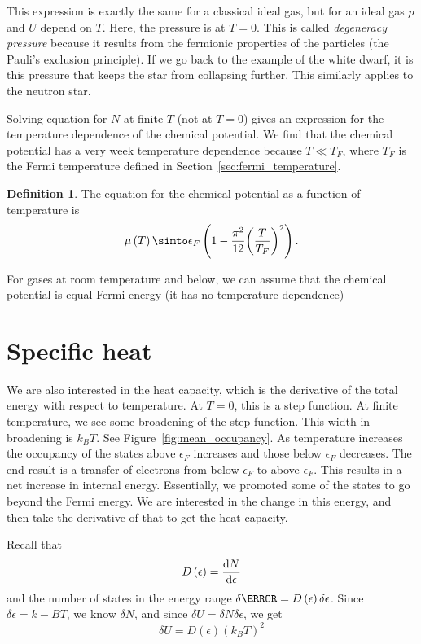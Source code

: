 \documentclass[12pt,chapterprefix=false,dvipsnames]{scrbook}
\theoremstyle{dotless}
\theoremstyle{definition}
\newtheorem{protodefinition}{Definition}[section]
\newenvironment{definition}
{\colorlet{shadecolor}{black!15}\begin{shaded}\begin{protodefinition}}
			{\end{protodefinition}\end{shaded}}
\begin{document}
This expression is exactly the same for a classical ideal gas,
but for an ideal gas $p$ and
$U$ depend on $T$. Here,
the pressure is at $T = 0$. This is called
\textit{degeneracy pressure} because it results from the fermionic
properties of the particles (the Pauli's exclusion principle).
If we go back to the example of the white dwarf, it is this
pressure that keeps the star from collapsing further. This
similarly applies to the neutron star.

Solving equation for $N$ at finite
$T$ (not at $T = 0$) gives
an expression for the temperature dependence of the chemical
potential. We find that the chemical potential has a very week
temperature dependence because $T \ll T_F$, where
$T_F$ is the Fermi temperature defined in
Section~\ref{sec:fermi_temperature}.
\begin{definition}
	The equation for the chemical potential as a function of
	temperature is
	\begin{equation}
		\mu\left(T\right)
		\simto
		\epsilon_F\left(1 - \frac{\pi^2}{12}{\left(\frac{T}{T_F}\right)}^2\right).
	\end{equation}

	For gases at room temperature and below, we can assume that the
	chemical potential is equal Fermi energy (it has no temperature
	dependence)
\end{definition}

\section{Specific heat}%
\label{sec:specific_heat}

We are also interested in the heat capacity, which is the
derivative of the total energy with respect to temperature. At
$T = 0$, this is a step function. At finite
temperature, we see some broadening of the step function. This
width in broadening is $k_B T$. See
Figure~\ref{fig:mean_occupancy}. As temperature increases the
occupancy of the states above $\epsilon_F$ increases
and those below $\epsilon_F$ decreases. The end
result is a transfer of electrons from below
$\epsilon_F$ to above $\epsilon_F$. This
results in a net increase in internal energy. Essentially, we
promoted some of the states to go beyond the Fermi energy. We
are interested in the change in this energy, and then take the
derivative of that to get the heat capacity.

Recall that
\begin{equation}
	\label{eq:density_of_states_wrt_number_of_states}
	D\left(\epsilon\right) = \dv{N}{\epsilon}
\end{equation}
and the number of states in the energy range
$\delta\N = D\left(\epsilon\right)\delta\epsilon$. Since $\delta\epsilon = k-B T$, we know
$\delta N$, and since $\delta U = \delta N\delta\epsilon$, we
get
\begin{equation}
	\delta U
	=
	D\left(\epsilon\right){\left(k_B T\right)}^2
\end{equation}
\end{document}

